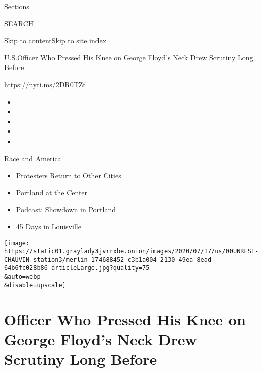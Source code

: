 Sections

SEARCH

\protect\hyperlink{site-content}{Skip to
content}\protect\hyperlink{site-index}{Skip to site index}

\href{/section/us}{U.S.}\textbar{}Officer Who Pressed His Knee on George
Floyd's Neck Drew Scrutiny Long Before

\url{https://nyti.ms/2DR0TZf}

\begin{itemize}
\item
\item
\item
\item
\item
\end{itemize}

\href{https://www.nytimes3xbfgragh.onion/news-event/george-floyd-protests-minneapolis-new-york-los-angeles?action=click\&pgtype=Article\&state=default\&region=TOP_BANNER\&context=storylines_menu}{Race
and America}

\begin{itemize}
\tightlist
\item
  \href{https://www.nytimes3xbfgragh.onion/2020/07/26/us/protests-portland-seattle-trump.html?action=click\&pgtype=Article\&state=default\&region=TOP_BANNER\&context=storylines_menu}{Protesters
  Return to Other Cities}
\item
  \href{https://www.nytimes3xbfgragh.onion/2020/07/24/us/portland-oregon-protests-white-race.html?action=click\&pgtype=Article\&state=default\&region=TOP_BANNER\&context=storylines_menu}{Portland
  at the Center}
\item
  \href{https://www.nytimes3xbfgragh.onion/2020/07/23/podcasts/the-daily/portland-protests.html?action=click\&pgtype=Article\&state=default\&region=TOP_BANNER\&context=storylines_menu}{Podcast:
  Showdown in Portland}
\item
  \href{https://www.nytimes3xbfgragh.onion/interactive/2020/07/16/us/black-lives-matter-protests-louisville-breonna-taylor.html?action=click\&pgtype=Article\&state=default\&region=TOP_BANNER\&context=storylines_menu}{45
  Days in Louisville}
\end{itemize}

\texttt{[image: https://static01.graylady3jvrrxbe.onion/images/2020/07/17/us/00UNREST-CHAUVIN-station3/merlin\_174688452\_c3b1a004-2130-49ea-8ead-64b6fc028b86-articleLarge.jpg?quality=75\\\&auto=webp\\\&disable=upscale]}

\hypertarget{officer-who-pressed-his-knee-on-george-floyds-neck-drew-scrutiny-long-before}{%
\section{Officer Who Pressed His Knee on George Floyd's Neck Drew
Scrutiny Long
Before}\label{officer-who-pressed-his-knee-on-george-floyds-neck-drew-scrutiny-long-before}}

